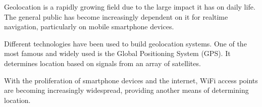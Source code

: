%
%

Geolocation is a rapidly growing field due to the large impact
it has on daily life. The general public has become
increasingly dependent on it for realtime navigation,
particularly on mobile smartphone devices.

Different technologies have been used to build geolocation
systems. One of the most famous and widely used is the Global
Positioning System (GPS). It determines location based on
signals from an array of satellites.

With the proliferation of smartphone devices and the internet,
WiFi access points are becoming increasingly widespread, 
providing another means of determining location.

